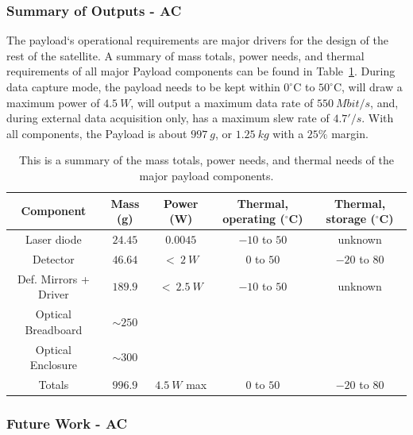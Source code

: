 \documentclass[12pt]{article}
\begin{document}

			\subsubsection{Summary of Outputs - AC}

The payload`s operational requirements are major drivers for the design of the rest of the satellite. A summary of mass totals, power needs, and thermal requirements of all major Payload components can be found in Table~\ref{fig:payload_summary_table}.  
During data capture mode, the payload needs to be kept within $0^\circ$C to $50^\circ$C, will draw a maximum power of $4.5\ W$, will output a maximum data rate of $550\ Mbit/s$, and, during external data acquisition only, has a maximum slew rate of $4.7'/s$. 
With all components, the Payload is about $997\ g$, or $1.25\ kg$ with a $25\%$ margin.  

\begin{table}
\caption{This is a summary of the mass totals, power needs, and thermal needs of the major payload components.}
\label{fig:payload_summary_table}
\begin{tabular}{|c||c|c|c|c|} \hline
	Component & Mass (g) & Power (W) & Thermal, operating ($^\circ$C) & Thermal, storage ($^\circ$C) \\ \hline \hline
Laser diode & $24.45$ & $0.0045$ & $-10$ to $50$ & unknown \\
Detector & $46.64$ & $<\ 2\ W$ & $0$ to $50$ & $-20$ to $80$ \\
Def. Mirrors + Driver & $189.9$ & $<\ 2.5\ W$ & $-10$ to $50$ & unknown \\
Optical Breadboard & $\sim 250$ & ~ & ~ & \\
Optical Enclosure & $\sim 300$ & ~ & ~ & \\ \hline \hline
Totals & $996.9$ & $4.5\ W$ max & $0$ to $50$ & $-20$ to $80$ \\ \hline
\end{tabular}
\end{table}




			\subsubsection{Future Work - AC}
\end{document}
